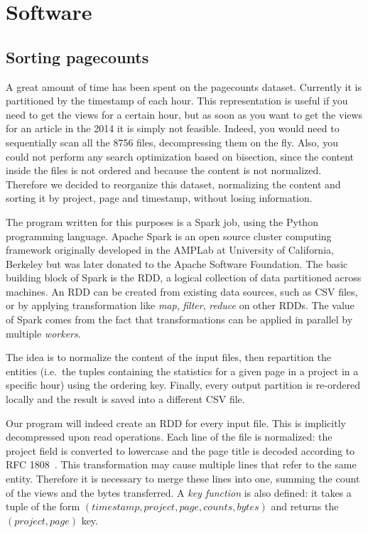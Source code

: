 \section{Software}
\label{sec:software}
\subsection{Sorting pagecounts}
\label{sub:Sorting pagecounts}
A great amount of time has been spent on the pagecounts dataset.
Currently it is partitioned by the timestamp of each hour.
This representation is useful if you need to get the views for a certain hour, but as soon as you want to get the views for an article in the 2014 it is simply not feasible.
Indeed, you would need to sequentially scan all the 8756 files, decompressing them on the fly.
Also, you could not perform any search optimization based on bisection, since the content inside the files is not ordered and because the content is not normalized.
Therefore we decided to reorganize this dataset, normalizing the content and sorting it by project, page and timestamp, without losing information.

The program written for this purposes is a Spark job, using the Python programming language.
Apache Spark is an open source cluster computing framework originally developed in the AMPLab at University of California, Berkeley but was later donated to the Apache Software Foundation.
The basic building block of Spark is the \ac{RDD}, a logical collection of data partitioned across machines.
An \acs{RDD} can be created from existing data sources, such as \ac{CSV} files, or by applying transformation like \emph{map}, \emph{filter}, \emph{reduce} on other \acp{RDD}.
The value of Spark comes from the fact that transformations can be applied in parallel by multiple \emph{workers}.

The idea is to normalize the content of the input files, then repartition the entities (i.e.\ the tuples containing the statistics for a given page in a project in a specific hour) using the ordering key.
Finally, every output partition is re-ordered locally and the result is saved into a different CSV file.

Our program will indeed create an \ac{RDD} for every input file.
This is implicitly decompressed upon read operations.
Each line of the file is normalized: the project field is converted to lowercase and the page title is decoded according to RFC 1808~\cite{rfc1808}.
This transformation may cause multiple lines that refer to the same entity.
Therefore it is necessary to merge these lines into one, summing the count of the views and the bytes transferred.
A \emph{key function} is also defined: it takes a tuple of the form $(timestamp, project, page, counts, bytes)$ and returns the $(project, page)$ key.

